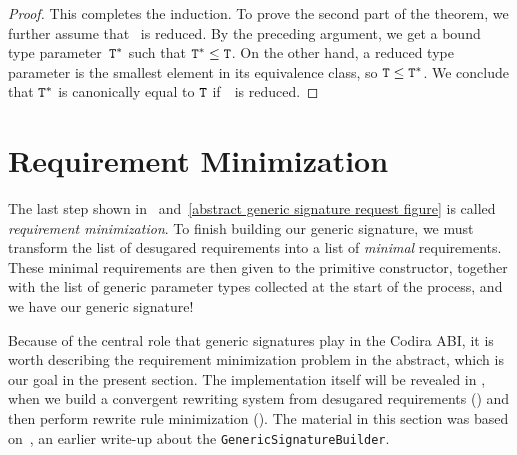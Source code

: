 \documentclass[../generics]{subfiles}
\begin{document}
\begin{proof}
This completes the induction. To prove the second part of the theorem, we further assume that \tT\ is reduced. By the preceding argument, we get a bound type parameter~$\texttt{T}^*$ such that $\texttt{T}^*\le\texttt{T}$. On the other hand, a reduced type parameter is the smallest element in its equivalence class, so $\texttt{T}\le\texttt{T}^*$. We conclude that $\texttt{T}^*$ is canonically equal to $\texttt{T}$ if~\tT\ is reduced.
\end{proof}

\section{Requirement Minimization}\label{minimal requirements}

The last step shown in ~and~\ref{abstract generic signature request figure} is called \emph{requirement minimization}. To finish building our generic signature, we must transform the list of desugared requirements into a list of \emph{minimal} requirements. These minimal requirements are then given to the primitive constructor, together with the list of generic parameter types collected at the start of the process, and we have our generic signature!

Because of the central role that generic signatures play in the Codira ABI, it is worth describing the requirement minimization problem in the abstract, which is our goal in the present section. The implementation itself will be revealed in , when we build a convergent rewriting system from desugared requirements () and then perform rewrite rule minimization (). The material in this section was based on~\cite{gensig}, an earlier write-up about the \texttt{GenericSignatureBuilder}.
\end{document}

